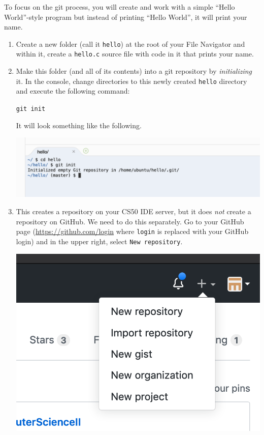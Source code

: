 \documentclass[12pt]{scrartcl}
\begin{document}
To focus on the git process, you will create and work with a simple
``Hello World''-style program but instead of printing ``Hello World'', 
it will print your name. 

\begin{enumerate}
  \item Create a new folder (call it \texttt{hello}) 
  at the root of your File Navigator and within it, create a 
  \texttt{hello.c} source file with code in it that
  prints your name.
  
  \item Make this folder (and all of its contents) into a git
  repository by \emph{initializing} it.  In the console, change
  directories to this newly created \texttt{hello}
  directory and execute the following command:
  
  \texttt{git init}
  
  It will look something like the following.
  \begin{center}
  \includegraphics[scale=0.50]{./hack1.0-files/cl-gitinit.png}
  \end{center}

  \item This creates a repository on your CS50 IDE server, but it
  does \emph{not} create a repository on GitHub.  We need to do 
  this separately.  Go to your GitHub page (\url{https://github.com/login}
  where \texttt{login} is replaced with your GitHub
  login) and in the upper right, select \texttt{New repository}.

  \begin{center}
  \includegraphics[scale=0.50]{./hack1.0-files/cl-githubNewRepo.png}
  \end{center}


\end{enumerate}
\end{document}
